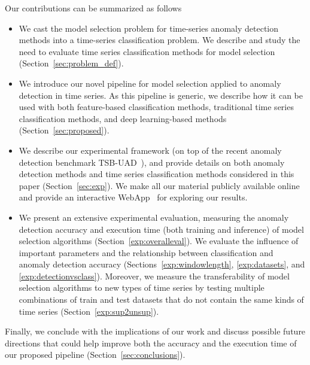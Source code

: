 Our contributions can be summarized as follows\syl{:}
\begin{itemize}[noitemsep, topsep=0pt, parsep=0pt, partopsep=0pt, leftmargin=0.4cm]
	\item We cast the model selection problem for time-series anomaly detection methods into a time-series classification problem. We describe and study the need to evaluate time series classification methods for model selection (Section~\ref{sec:problem_def}). 
	\item We introduce our novel pipeline for model selection applied to anomaly detection in time series. As this pipeline is generic, we describe how it can be used with both feature-based classification methods, traditional time series classification methods, and deep learning-based methods (Section~\ref{sec:proposed}).
	\item We describe our experimental framework (on top of the recent anomaly detection benchmark TSB-UAD~\cite{10.14778/3529337.3529354}), and provide details on both anomaly detection methods and time series classification methods considered in this paper (Section~\ref{sec:exp}). We make all our material publicly available online~\cite{ourcode} and provide an interactive WebApp~\cite{ourwebsite} for exploring our results. 
	\item We present an extensive experimental evaluation, measuring the anomaly detection accuracy and execution time (both training and inference) of model selection algorithms (Section~\ref{exp:overalleval}). We evaluate the influence of important parameters and the relationship between classification and anomaly detection accuracy (Sections~\ref{exp:windowlength}, \ref{exp:datasets}, and \ref{exp:detectionvsclass}). Moreover, we measure the transferability of model selection algorithms to new types of time series by testing multiple combinations of train and test datasets that do not contain the same kinds of time series (Section~\ref{exp:sup2unsup}).
\end{itemize}
Finally, we conclude with the implications of our work and discuss possible future directions that could help improve both the accuracy and the execution time of our proposed pipeline (Section~\ref{sec:conclusions}).